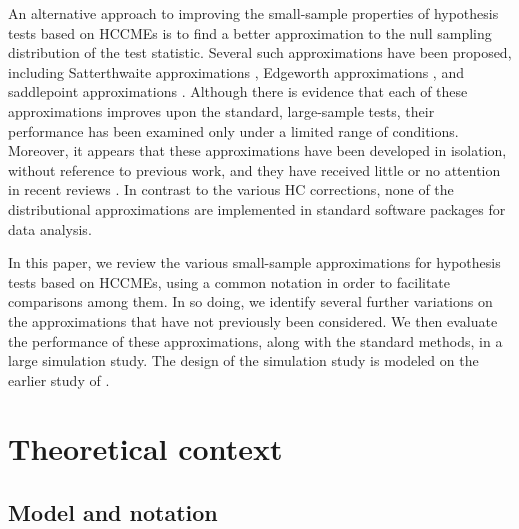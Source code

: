 \documentclass[12pt]{article}\usepackage[]{graphicx}\usepackage[]{color}
\begin{document}
An alternative approach to improving the small-sample properties of hypothesis tests based on HCCMEs is to find a better approximation to the null sampling distribution of the test statistic. 
Several such approximations have been proposed, including Satterthwaite approximations \citep{Lipsitz1999degrees}, Edgeworth approximations \citep{Rothenberg1988approximate, Kauermann2001note}, and saddlepoint approximations \citep{McCaffrey2006improved}. 
Although there is evidence that each of these approximations improves upon the standard, large-sample tests, their performance has been examined only under a limited range of conditions. 
Moreover, it appears that these approximations have been developed in isolation, without reference to previous work, and they have received little or no attention in recent reviews \citep[e.g., none are discussed by][]{MacKinnon2013thirty}. 
In contrast to the various HC corrections, none of the distributional approximations are implemented in standard software packages for data analysis. 

In this paper, we review the various small-sample approximations for hypothesis tests based on HCCMEs, using a common notation in order to facilitate comparisons among them. In so doing, we identify several further variations on the approximations that have not previously been considered. We then evaluate the performance of these approximations, along with the standard methods, in a large simulation study. The design of the simulation study is modeled on the earlier study of \citet{Long2000using}.

\section{Theoretical context}
\label{sec:context}

\subsection{Model and notation}
\label{subsec:model}
\end{document}

